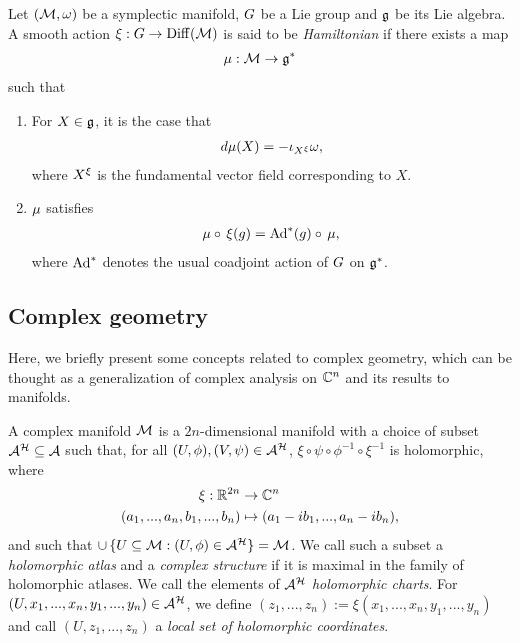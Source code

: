 \documentclass[notas.tex]{subfiles}
\begin{document}
\begin{defn}
	Let $(\mathcal{M}, \omega)$ be a symplectic manifold, $G$ be a Lie group and $\mathfrak{g}$ be its Lie algebra. A smooth action $\xi: G \to \operatorname*{Diff}(\mathcal{M})$ is said to be \emph{Hamiltonian} if there exists a map
	\begin{align*}
		\mu: \mathcal{M} \to \mathfrak{g}^*
	\end{align*} 
	such that
	\begin{enumerate}
		\item For $X \in \mathfrak{g}$, it is the case that
		\begin{align*}
			d \mu(X) = - \iota_{X^{\xi}}\omega,
		\end{align*}
		where $X^\xi$ is the fundamental vector field corresponding to $X$.
		\item $\mu$ satisfies
		\begin{align*}
			\mmap \circ \hact(g) = \Ad^*(g) \circ \mmap,
		\end{align*}
		where $\operatorname{Ad}^*$ denotes the usual coadjoint action of $G$ on $\mathfrak{g}^*$.
	\end{enumerate}
\end{defn}

\subsection{Complex geometry} \label{sec_complex}
Here, we briefly present some concepts related to complex geometry, which can be thought as a generalization of complex analysis on $\mathbb{C}^n$ and its results to manifolds. 
\begin{defn}\label{def_complex_mfld}
	A complex manifold $\mathcal{M}$ is a $2n$-dimensional manifold with a choice of subset $\mathcal{A}^{\mathcal{H}} \subseteq \mathcal{A}$ such that, for all $(U,\phi), (V,\psi) \in \mathcal{A}^{\mathcal{H}}$, $\xi \circ \psi \circ \phi^{-1} \circ \xi^{-1}$ is holomorphic, where
	\begin{align*}
		\xi: \mathbb{R}^{2n} &\to \mathbb{C}^n \\
		(a_1,...,a_n,b_1,...,b_n) &\mapsto (a_1 - i b_1,...,a_n-ib_n),
	\end{align*}
	and such that $\cup \, \{U \subseteq \mathcal{M} : (U,\phi) \in \mathcal{A}^{\mathcal{H}}\} = \mathcal{M}$. We call such a subset a \emph{holomorphic atlas} and a \emph{complex structure} if it is maximal in the family of holomorphic atlases. We call the elements of $\mathcal{A}^{\mathcal{H}}$ \emph{holomorphic charts}. For $(U,x_1,...,x_n,y_1,...,y_n) \in \mathcal{A}^{\mathcal{H}}$, we define $(z_1,...,z_n) := \xi(x_1,...,x_n,y_1,...,y_n)$ and call $(U, z_1,...,z_n)$ a \emph{local set of holomorphic coordinates}.
\end{defn}
\end{document}
